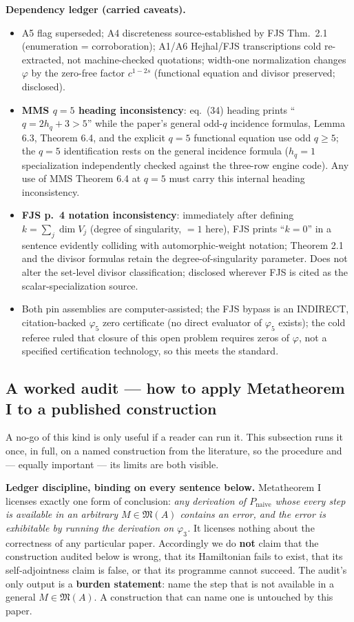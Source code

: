 \documentclass[11pt]{amsart}
\theoremstyle{remark}
\begin{document}
\textbf{Dependency ledger (carried caveats).}
\begin{itemize}
\item A5 flag superseded; A4 discreteness source-established by FJS
Thm.\ 2.1 (enumeration = corroboration); A1/A6 Hejhal/FJS transcriptions
cold re-extracted, not machine-checked quotations; width-one
normalization changes $\varphi$ by the zero-free factor $c^{1-2s}$
(functional equation and divisor preserved; disclosed).
\item \textbf{MMS $q=5$ heading inconsistency}: eq.\ (34) heading prints
``$q=2h_q+3>5$'' while the paper's general odd-$q$ incidence formulas,
Lemma 6.3, Theorem 6.4, and the explicit $q=5$ functional equation use
odd $q\ge5$; the $q=5$ identification rests on the general incidence
formula ($h_q=1$ specialization independently checked against the
three-row engine code). Any use of MMS Theorem 6.4 at $q=5$ must carry
this internal heading inconsistency.
\item \textbf{FJS p.\ 4 notation inconsistency}: immediately after
defining $k = \sum_j \dim V_j$ (degree of singularity, $=1$ here), FJS
prints ``$k=0$'' in a sentence evidently colliding with automorphic-weight
notation; Theorem 2.1 and the divisor formulas retain the
degree-of-singularity parameter. Does not alter the set-level divisor
classification; disclosed wherever FJS is cited as the scalar-specialization
source.
\item Both pin assemblies are computer-assisted; the FJS bypass is an
INDIRECT, citation-backed $\varphi_5$ zero certificate (no direct
evaluator of $\varphi_5$ exists); the cold referee ruled that closure of
this open problem requires zeros of $\varphi$, not a specified
certification technology, so this meets the standard.
\end{itemize}

\subsection{A worked audit --- how to apply Metatheorem I to a published construction}

A no-go of this kind is only useful if a reader can run it. This
subsection runs it once, in full, on a named construction from the
literature, so the procedure and --- equally important --- its limits
are both visible.

\textbf{Ledger discipline, binding on every sentence below.}
Metatheorem I licenses exactly one form of conclusion: \emph{any
derivation of $P_{\mathrm{naive}}$ whose every step is available in an
arbitrary $M\in\mathfrak M(A)$ contains an error, and the error is
exhibitable by running the derivation on $\varphi_3$.} It licenses
nothing about the correctness of any particular paper. Accordingly we do
\textbf{not} claim that the construction audited below is wrong, that its
Hamiltonian fails to exist, that its self-adjointness claim is false, or
that its programme cannot succeed. The audit's only output is a
\textbf{burden statement}: name the step that is not available in a
general $M\in\mathfrak M(A)$. A construction that can name one is
untouched by this paper.
\end{document}
